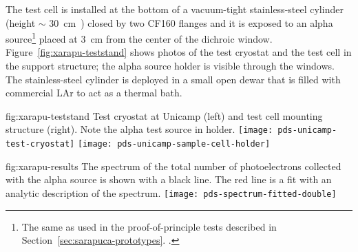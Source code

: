 The test cell is installed at the bottom of a  vacuum-tight  stainless-steel cylinder (height $\sim$ \SI{30}{cm)} closed by two CF160 flanges and it is exposed to an alpha source\footnote{The same as used in the  proof-of-principle tests described in Section~\ref{sec:sarapuca-prototypes}. 
.} 
placed at \SI{3}{cm} from the center of the dichroic window. Figure~\ref{fig:xarapu-teststand} shows photos of the test cryostat and the test cell in the support structure; the alpha source holder is visible through the windows.
The stainless-steel cylinder  is deployed in a small open dewar that is filled with commercial LAr to act as a thermal bath.

\begin{dunefigure}{fig:xarapu-teststand}
{Test cryostat at Unicamp (left) and  test cell mounting structure (right).  Note the alpha test source in holder.} 
	\texttt{[image: pds-unicamp-test-cryostat]} \quad
	\texttt{[image: pds-unicamp-sample-cell-holder]}
\end{dunefigure}  


\begin{dunefigure}{fig:xarapu-results}
{The  spectrum of the total number of photoelectrons collected with the alpha source is shown with a black line. The red line is a fit with an analytic description of the spectrum.} 
	\texttt{[image: pds-spectrum-fitted-double]}
\end{dunefigure}  

